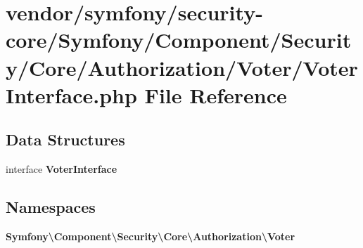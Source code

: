 \section{vendor/symfony/security-\/core/\+Symfony/\+Component/\+Security/\+Core/\+Authorization/\+Voter/\+Voter\+Interface.php File Reference}
\label{_voter_interface_8php}
\subsection*{Data Structures}
\begin{DoxyCompactItemize}
\item 
interface {\bf Voter\+Interface}
\end{DoxyCompactItemize}
\subsection*{Namespaces}
\begin{DoxyCompactItemize}
\item 
 {\bf Symfony\textbackslash{}\+Component\textbackslash{}\+Security\textbackslash{}\+Core\textbackslash{}\+Authorization\textbackslash{}\+Voter}
\end{DoxyCompactItemize}
